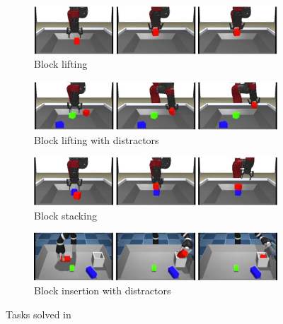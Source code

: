 \begin{figure}[htbp]
    \centering
    \begin{subfigure}[b]{0.45\textwidth}
        \includegraphics[width=\textwidth]{Figures/images/trail/block_lifting.jpg}
        \caption{Block lifting}
        \label{fig:block_lifting}
    \end{subfigure}
    \hfill
    \begin{subfigure}[b]{0.45\textwidth}
        \includegraphics[width=\textwidth]{Figures/images/trail/block_lifting_with_distractors.jpg}
        \caption{Block lifting with distractors}
        \label{fig:block_lifting_with_distractors}
    \end{subfigure}
    \hfill
    \begin{subfigure}[b]{0.45\textwidth}
        \includegraphics[width=\textwidth]{Figures/images/trail/block_stacking.jpg}
        \caption{Block stacking}
        \label{fig:block_stacking}
    \end{subfigure}
    \hfill
    \hfill
    \begin{subfigure}[b]{0.45\textwidth}
        \includegraphics[width=\textwidth]{Figures/images/trail/block_insertion_with_distractors.jpg}
        \caption{Block insertion with distractors}
        \label{fig:bloc_insertion_with_distractors}
    \end{subfigure}
    \hfill
 
   \caption{Tasks solved in \cite{zolna2021task_relevant_ail}}
   \label{fig:trail}
\end{figure}

